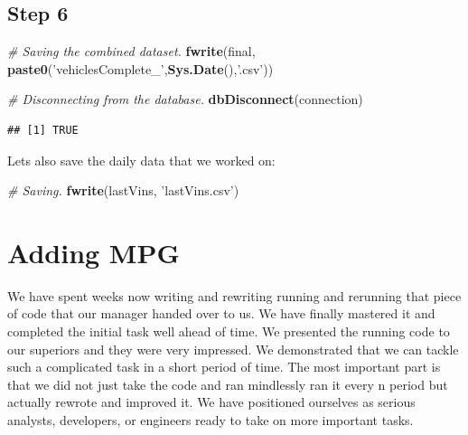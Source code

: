 \documentclass[]{book}
\newenvironment{Shaded}{\begin{snugshade}}{\end{snugshade}}
\newcommand{\CommentTok}[1]{\textcolor[rgb]{0.56,0.35,0.01}{\textit{#1}}}
\newcommand{\KeywordTok}[1]{\textcolor[rgb]{0.13,0.29,0.53}{\textbf{#1}}}
\newcommand{\NormalTok}[1]{#1}
\newcommand{\StringTok}[1]{\textcolor[rgb]{0.31,0.60,0.02}{#1}}
\begin{document}
\hypertarget{step-6-2}{%
\subsection{Step 6}\label{step-6-2}}

\begin{Shaded}
\begin{Highlighting}[]
\CommentTok{# Saving the combined dataset.}
\KeywordTok{fwrite}\NormalTok{(final, }\KeywordTok{paste0}\NormalTok{(}\StringTok{'vehiclesComplete_'}\NormalTok{,}\KeywordTok{Sys.Date}\NormalTok{(),}\StringTok{'.csv'}\NormalTok{))}
\end{Highlighting}
\end{Shaded}

\begin{Shaded}
\begin{Highlighting}[]
\CommentTok{# Disconnecting from the database.}
\KeywordTok{dbDisconnect}\NormalTok{(connection)}
\end{Highlighting}
\end{Shaded}

\begin{verbatim}
## [1] TRUE
\end{verbatim}

Lets also save the daily data that we worked on:

\begin{Shaded}
\begin{Highlighting}[]
\CommentTok{# Saving.}
\KeywordTok{fwrite}\NormalTok{(lastVins, }\StringTok{'lastVins.csv'}\NormalTok{)}
\end{Highlighting}
\end{Shaded}

\hypertarget{adding-mpg}{%
\section{Adding MPG}\label{adding-mpg}}

We have spent weeks now writing and rewriting running and rerunning that piece of code that our manager handed over to us. We have finally mastered it and completed the initial task well ahead of time. We presented the running code to our superiors and they were very impressed. We demonstrated that we can tackle such a complicated task in a short period of time. The most important part is that we did not just take the code and ran mindlessly ran it every n period but actually rewrote and improved it. We have positioned ourselves as serious analysts, developers, or engineers ready to take on more important tasks.
\end{document}
